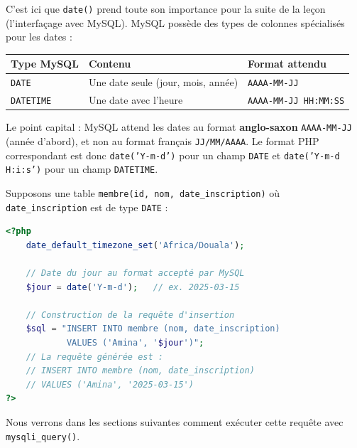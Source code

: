 \documentclass[11pt]{article}
\begin{document}
C'est ici que \texttt{date()} prend toute son importance pour la suite de la leçon (l'interfaçage avec MySQL). MySQL possède des types de colonnes spécialisés pour les dates :

\begin{center}
\begin{tabularx}{\linewidth}{|l|X|l|}
\hline
\rowcolor{popblueL} \textbf{Type MySQL} & \textbf{Contenu} & \textbf{Format attendu} \\
\hline
\texttt{DATE} & Une date seule (jour, mois, année) & \texttt{AAAA-MM-JJ} \\
\hline
\texttt{DATETIME} & Une date avec l'heure & \texttt{AAAA-MM-JJ HH:MM:SS} \\
\hline
\end{tabularx}
\end{center}

Le point capital : MySQL attend les dates au format \textbf{anglo-saxon} \texttt{AAAA-MM-JJ} (année d'abord), et non au format français \texttt{JJ/MM/AAAA}. Le format PHP correspondant est donc \texttt{date('Y-m-d')} pour un champ \texttt{DATE} et \texttt{date('Y-m-d H:i:s')} pour un champ \texttt{DATETIME}.

\begin{exemplebox}
Supposons une table \texttt{membre(id, nom, date\_inscription)} où \texttt{date\_inscription} est de type \texttt{DATE} :
\begin{lstlisting}[language=Php]
<?php
    date_default_timezone_set('Africa/Douala');

    // Date du jour au format accepté par MySQL
    $jour = date('Y-m-d');   // ex. 2025-03-15

    // Construction de la requête d'insertion
    $sql = "INSERT INTO membre (nom, date_inscription)
            VALUES ('Amina', '$jour')";
    // La requête générée est :
    // INSERT INTO membre (nom, date_inscription)
    // VALUES ('Amina', '2025-03-15')
?>
\end{lstlisting}
Nous verrons dans les sections suivantes comment exécuter cette requête avec \texttt{mysqli\_query()}.
\end{exemplebox}
\end{document}
